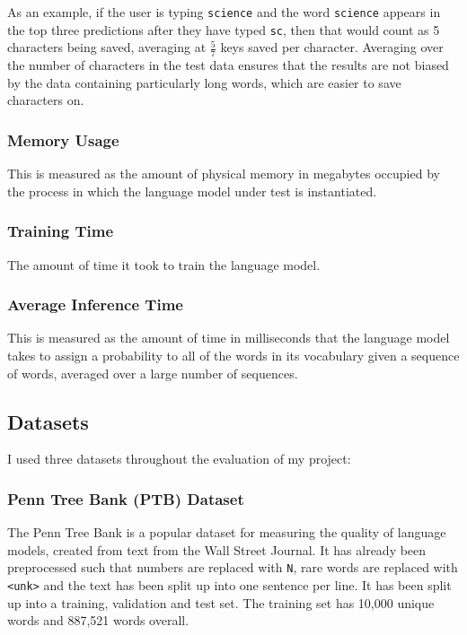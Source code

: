 \documentclass[a4paper, 12pt]{report}
\newcommand{\ttt}[1]{\texttt{#1}}
\begin{document}
As an example, if the user is typing \ttt{science} and the word \ttt{science} appears in the top three predictions after they have typed \ttt{sc}, then that would count as 5 characters being saved, averaging at $\frac{5}{7}$ keys saved per character. Averaging over the number of characters in the test data ensures that the results are not biased by the data containing particularly long words, which are easier to save characters on.

\subsubsection{Memory Usage}

This is measured as the amount of physical memory in megabytes occupied by the process in which the language model under test is instantiated.

\subsubsection{Training Time}

The amount of time it took to train the language model.

\subsubsection{Average Inference Time}

This is measured as the amount of time in milliseconds that the language model takes to assign a probability to all of the words in its vocabulary given a sequence of words, averaged over a large number of sequences.

\subsection{Datasets}

I used three datasets throughout the evaluation of my project:

\subsubsection{Penn Tree Bank (PTB) Dataset}

The Penn Tree Bank is a popular dataset for measuring the quality of language models, created from text from the Wall Street Journal. It has already been preprocessed such that numbers are replaced with \ttt{N}, rare words are replaced with \ttt{<unk>} and the text has been split up into one sentence per line. It has been split up into a training, validation and test set. The training set has 10,000 unique words and 887,521 words overall. \\
\end{document}
